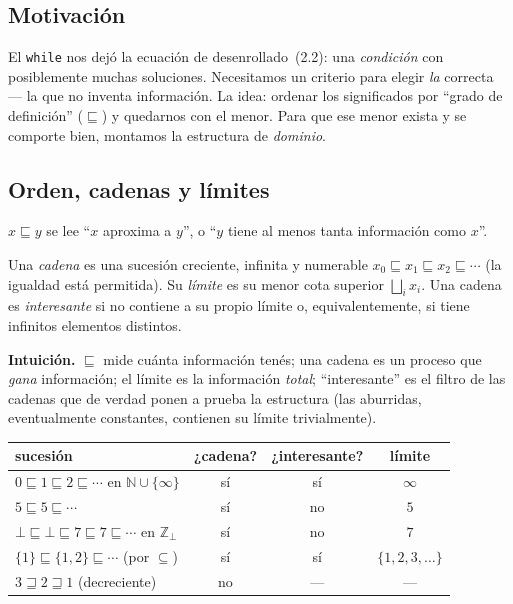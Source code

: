 \subsection*{Motivación}
El \texttt{while} nos dejó la ecuación de desenrollado~(2.2): una \emph{condición}
con posiblemente muchas soluciones. Necesitamos un criterio para elegir
\emph{la} correcta --- la que no inventa información. La idea: ordenar los
significados por ``grado de definición'' ($\sqsubseteq$) y quedarnos con el menor.
Para que ese menor exista y se comporte bien, montamos la estructura de \emph{dominio}.

\subsection*{Orden, cadenas y límites}
\begin{definition}
$x \sqsubseteq y$ se lee ``$x$ aproxima a $y$'', o ``$y$ tiene al menos tanta
información como $x$''.
\end{definition}

\begin{definition}
Una \emph{cadena} es una sucesión creciente, infinita y numerable
$x_0 \sqsubseteq x_1 \sqsubseteq x_2 \sqsubseteq \cdots$ (la igualdad está permitida).
Su \emph{límite} es su menor cota superior $\bigsqcup_i x_i$. Una cadena es
\emph{interesante} si no contiene a su propio límite o, equivalentemente, si
tiene infinitos elementos distintos.
\end{definition}

\noindent\textbf{Intuición.} $\sqsubseteq$ mide cuánta información tenés; una cadena
es un proceso que \emph{gana} información; el límite es la información \emph{total};
``interesante'' es el filtro de las cadenas que de verdad ponen a prueba la
estructura (las aburridas, eventualmente constantes, contienen su límite trivialmente).

\begin{example}
\begin{center}
\begin{tabular}{lccc}
\toprule
\rowcolor{accent!12}
\textbf{sucesión} & \textbf{¿cadena?} & \textbf{¿interesante?} & \textbf{límite} \\
\midrule
$0 \sqsubseteq 1 \sqsubseteq 2 \sqsubseteq \cdots$ en $\mathbb{N}\cup\{\infty\}$ & sí & sí & $\infty$ \\
$5 \sqsubseteq 5 \sqsubseteq \cdots$ & sí & no & $5$ \\
$\bot \sqsubseteq \bot \sqsubseteq 7 \sqsubseteq 7 \sqsubseteq \cdots$ en $\mathbb{Z}_\bot$ & sí & no & $7$ \\
$\{1\} \sqsubseteq \{1,2\} \sqsubseteq \cdots$ (por $\subseteq$) & sí & sí & $\{1,2,3,\dots\}$ \\
$3 \sqsupseteq 2 \sqsupseteq 1$ (decreciente) & no & --- & --- \\
\bottomrule
\end{tabular}
\end{center}
\end{example}

